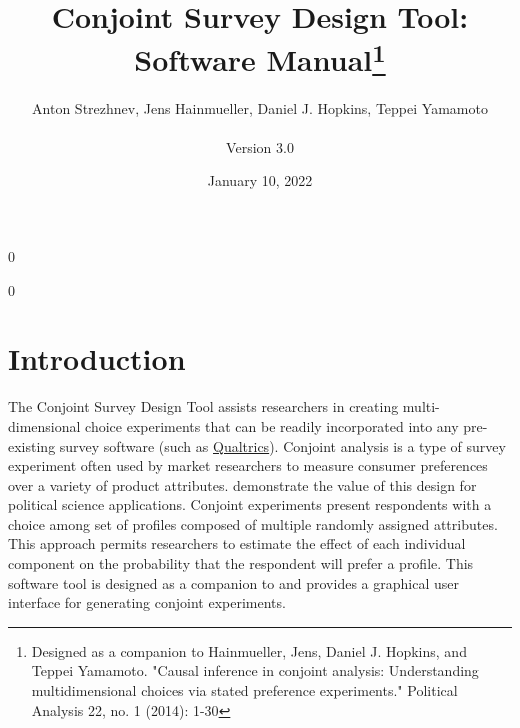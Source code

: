 \documentclass[12pt]{article}
\newcommand\spacingset[1]{\renewcommand{\baselinestretch}{#1}\small\normalsize}
\begin{document}

\newcommand{\blind}{0}

\newcommand{\tit}{Conjoint Survey Design Tool: Software Manual\thanks{Designed as a companion to Hainmueller, Jens, Daniel J. Hopkins, and Teppei Yamamoto. "Causal inference in conjoint analysis: Understanding multidimensional choices via stated preference experiments." Political Analysis 22, no. 1 (2014): 1-30}}

\blind
\title{\bf \tit}
  \author{Anton Strezhnev, Jens Hainmueller, Daniel J. Hopkins, Teppei Yamamoto\\\\Version 3.0}

\date{January 10, 2022}
\maketitle
{}\blind
\maketitle
\fi


\thispagestyle{empty}
\setcounter{page}{0}
\spacingset{1}

\clearpage



\spacingset{1.5}

\tableofcontents
\clearpage
\section{Introduction}

The Conjoint Survey Design Tool assists researchers in creating multi-dimensional choice experiments that can be readily incorporated into any pre-existing survey software (such as \href{http://www.qualtrics.com/}{Qualtrics}). Conjoint analysis is a type of survey experiment often used by market researchers to measure consumer preferences over a variety of product attributes. \cite{hainmueller2013} demonstrate the value of this design for political science applications. Conjoint experiments present respondents with a choice among set of profiles composed of multiple randomly assigned attributes. This approach permits researchers to estimate the effect of each individual component on the probability that the respondent will prefer a profile. This software tool is designed as a companion to \cite{hainmueller2013} and provides a graphical user interface for generating conjoint experiments.
\end{document}
